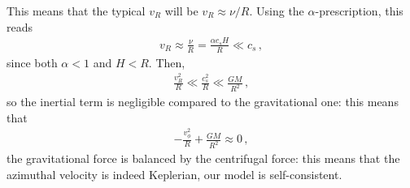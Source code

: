 \documentclass[main.tex]{subfiles}
\begin{document}
This means that the typical \(v_R\) will be \(v_R \approx \nu /R\). 
Using the \(\alpha \)-prescription, this reads 
%
\begin{align}
v_R \approx \frac{\nu}{R} = \frac{\alpha c_s H}{R} \ll c_s 
\,,
\end{align}
%
since both \(\alpha < 1\) and \(H < R\).
Then, 
%
\begin{align}
\frac{v_R^2}{R} \ll \frac{c_s^2}{R} \ll \frac{GM}{R^2}
\,,
\end{align}
%
so  the inertial term is negligible compared to the gravitational one: this means that 
%
\begin{align}
- \frac{v_\phi^2}{R} + \frac{GM}{R^2} \approx 0
\,,
\end{align}
%
the gravitational force is balanced by the centrifugal force: this means that the azimuthal velocity is indeed Keplerian, our model is self-consistent. 
\end{document}
